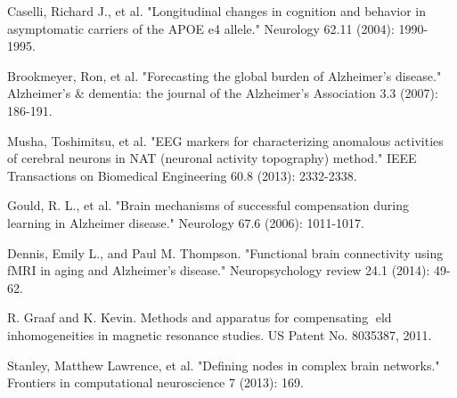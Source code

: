 \documentclass[preprint,12pt]{elsarticle}
\begin{document}
	
	
	\begin{thebibliography}{1}
		
		Caselli, Richard J., et al. "Longitudinal changes in cognition and behavior in asymptomatic carriers of the APOE e4 allele." Neurology 62.11 (2004): 1990-1995.
		
		Brookmeyer, Ron, et al. "Forecasting the global burden of Alzheimer’s disease." Alzheimer's \& dementia: the journal of the Alzheimer's Association 3.3 (2007): 186-191.
		
		Musha, Toshimitsu, et al. "EEG markers for characterizing anomalous activities of cerebral neurons in NAT (neuronal activity topography) method." IEEE Transactions on Biomedical Engineering 60.8 (2013): 2332-2338.
		
		Gould, R. L., et al. "Brain mechanisms of successful compensation during learning in Alzheimer disease." Neurology 67.6 (2006): 1011-1017.
		
		Dennis, Emily L., and Paul M. Thompson. "Functional brain connectivity using fMRI in aging and Alzheimer’s disease." Neuropsychology review 24.1 (2014): 49-62.
		
		
		
		R. Graaf and K. Kevin. Methods and apparatus for
		compensating eld inhomogeneities in magnetic resonance
		studies. US Patent No. 8035387, 2011.
		
		
		Stanley, Matthew Lawrence, et al. "Defining nodes in complex brain networks." Frontiers in computational neuroscience 7 (2013): 169.
		

\end{thebibliography}
\end{document}
